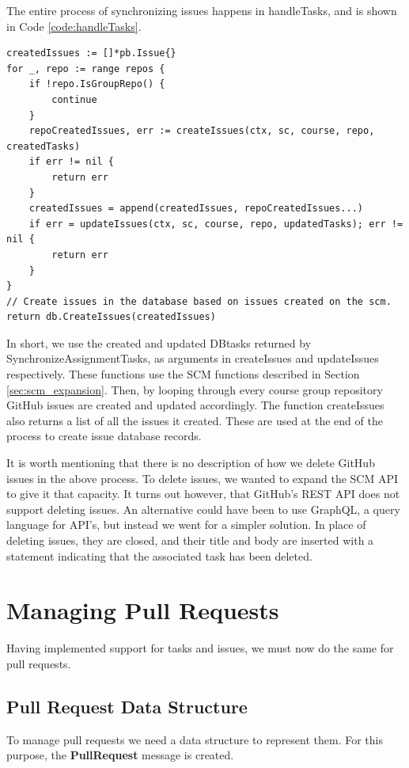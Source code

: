 The entire process of synchronizing issues happens in handleTasks, and is shown in Code \ref{code:handleTasks}.
\begin{lstlisting}[caption={Issue synchronization performed by handleTasks}, language=Golang, label={code:handleTasks}]
createdIssues := []*pb.Issue{}
for _, repo := range repos {
	if !repo.IsGroupRepo() {
		continue
	}
	repoCreatedIssues, err := createIssues(ctx, sc, course, repo, createdTasks)
	if err != nil {
		return err
	}
	createdIssues = append(createdIssues, repoCreatedIssues...)
	if err = updateIssues(ctx, sc, course, repo, updatedTasks); err != nil {
		return err
	}
}
// Create issues in the database based on issues created on the scm.
return db.CreateIssues(createdIssues)
\end{lstlisting}

In short, we use the created and updated DBtasks returned by SynchronizeAssignmentTasks, as arguments in createIssues and updateIssues respectively.
These functions use the SCM functions described in Section \ref{sec:scm_expansion}.
Then, by looping through every course group repository GitHub issues are created and updated accordingly.
The function createIssues also returns a list of all the issues it created.
These are used at the end of the process to create issue database records.

It is worth mentioning that there is no description of how we delete GitHub issues in the above process.
To delete issues, we wanted to expand the SCM API to give it that capacity.
It turns out however, that GitHub's REST API does not support deleting issues.
An alternative could have been to use GraphQL, a query language for API's, but instead we went for a simpler solution.
In place of deleting issues, they are closed, and their title and body are inserted with a statement indicating that the associated task has been deleted.

\section{Managing Pull Requests}

Having implemented support for tasks and issues, we must now do the same for pull requests.

\subsection{Pull Request Data Structure}
\label{sec:pull-request-data-structure}

To manage pull requests we need a data structure to represent them.
For this purpose, the \textbf{PullRequest} message is created.


